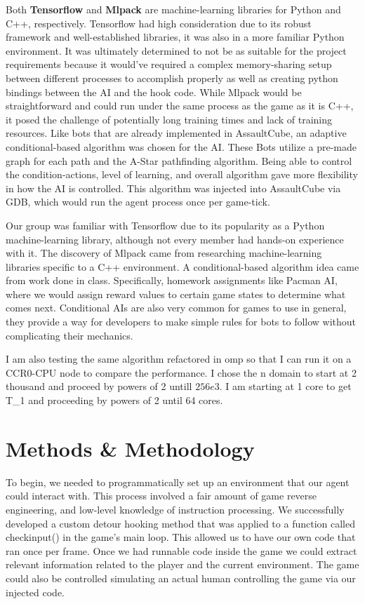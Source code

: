 \documentclass[11pt,a4paper]{article}
\begin{document}
Both \textbf{Tensorflow} and \textbf{Mlpack} are machine-learning libraries for Python and C++, respectively. Tensorflow had high consideration due to its robust framework and well-established libraries, it was also in a more familiar Python environment. It was ultimately determined to not be as suitable for the project requirements because it would’ve required a complex memory-sharing setup between different processes to accomplish properly as well as creating python bindings between the AI and the hook code. While Mlpack would be straightforward and could run under the same process as the game as it is C++, it posed the challenge of potentially long training times and lack of training resources. Like bots that are already implemented in AssaultCube, an adaptive conditional-based algorithm was chosen for the AI. These Bots utilize a pre-made graph for each path and the A-Star pathfinding algorithm. Being able to control the condition-actions, level of learning, and overall algorithm gave more flexibility in how the AI is controlled. This algorithm was injected into AssaultCube via GDB, which would run the agent process once per game-tick.

Our group was familiar with Tensorflow due to its popularity as a Python machine-learning library, although not every member had hands-on experience with it. The discovery of Mlpack came from researching machine-learning libraries specific to a C++ environment. A conditional-based algorithm idea came from work done in class. Specifically, homework assignments like Pacman AI, where we would assign reward values to certain game states to determine what comes next. Conditional AIs are also very common for games to use in general, they provide a way for developers to make simple rules for bots to follow without complicating their mechanics.

I am also testing the same algorithm refactored in omp so that I can run it on a CCR0-CPU node to compare the performance. I chose the n domain to start at 2 thousand and proceed by powers of 2 untill $256e3$. I am starting at 1 core to get T\_1 and proceeding by powers of 2 until 64 cores.

\section{Methods \& Methodology}
To begin, we needed to programmatically set up an environment that our agent could interact with. This process involved a fair amount of game reverse engineering, and low-level knowledge of instruction processing. We successfully developed a custom detour hooking method that was applied to a function called checkinput() in the game’s main loop. This allowed us to have our own code that ran once per frame. Once we had runnable code inside the game we could extract relevant information related to the player and the current environment. The game could also be controlled simulating an actual human controlling the game via our injected code. 
\end{document}
